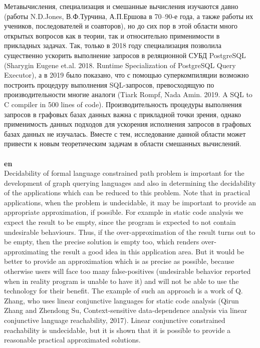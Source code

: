 \documentclass[12pt]{article}  %
\theoremstyle{remark}
\begin{document}
Метавычисления, специализация и смешанные вычисления изучаются давно (работы N.D.Jones, В.Ф.Турчина, А.П.Ершова в 70--90-е года, а также работы их учеников, последователей и соавторов), но до сих пор в этой области много открытых вопросов как в теории, так и относительно применимости в прикладных задачах.
Так, только в 2018 году специализация позволила существенно ускорить выполнение запросов в реляционной СУБД PostgreSQL (Sharygin Eugene et.al. 2018. Runtime Specialization of PostgreSQL Query Executor), а в 2019 было показано, что с помощью суперкомпиляции возможно построить процедуру выполнения SQL-запросов, превосходящую по производительности многие аналоги (Tiark Rompf, Nada Amin. 2019. A SQL to C compiler in 500 lines of code).
Производительность процедуры выполнения запросов в графовых базах данных важна с прикладной точки зрения, однако применимость данных подходов для ускорения исполнения запросов в графовых базах данных не изучалась.
Вместе с тем, исследование данной области может привести к новым теоретическим задачам в области смешанных вычислений.
\\
\\
\textbf{en}\\
Decidability of formal language constrained path problem is important for the development of graph querying languages and also in determining the decidability of the applications which can be reduced to this problem.
Note that in practical applications, when the problem is undecidable, it may be important to provide an appropriate approximation, if possible.
For example in static code analysis we expect the result to be empty, since the program is expected to not contain undesirable behaviours. 
Thus, if the over-approximation of the result turns out to be empty, then the precise solution is empty too, which renders over-approximating the result a good idea in this application area. 
But it would be better to provide an approximation which is as precise as possible, because otherwise users will face too many false-positives (undesirable behavior reported when in reality program is unable to have it) and will not be able to use the technology for their benefit. 
The example of such an approach is a work of Q. Zhang, who uses linear conjunctive languages for static code analysis (Qirun Zhang and Zhendong Su, Context-sensitive data-dependence analysis via linear conjunctive language reachability, 2017).
Linear conjunctive constrained reachability is undecidable, but it is shown that it is possible to provide a reasonable practical approximated solutions.
\end{document}
